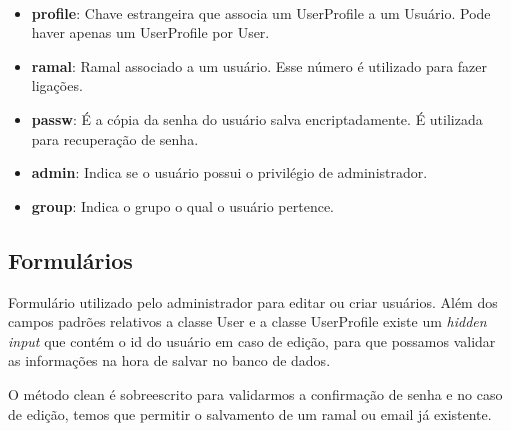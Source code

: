 \documentclass[letterpaper,10pt,brazil]{sphinxmanual}
\begin{document}
\begin{fulllineitems}
\label{apps/accounts:accounts.models.UserProfile}~\begin{itemize}
\item {} 
\textbf{profile}: Chave estrangeira que associa um UserProfile a um Usuário. Pode haver apenas um UserProfile por User.

\item {} 
\textbf{ramal}: Ramal associado a um usuário. Esse número é utilizado para fazer ligações.

\item {} 
\textbf{passw}: É a cópia da senha do usuário salva encriptadamente. É utilizada para recuperação de senha.

\item {} 
\textbf{admin}: Indica se o usuário possui o privilégio de administrador.

\item {} 
\textbf{group}: Indica o grupo o qual o usuário pertence.

\end{itemize}

\end{fulllineitems}



\subsection{Formulários}
\label{apps/accounts:module-accounts.forms}\label{apps/accounts:formularios}

\begin{fulllineitems}
\label{apps/accounts:accounts.forms.UserForm}
Formulário utilizado pelo administrador para editar ou criar usuários. Além dos campos padrões relativos a classe User e a classe UserProfile existe um \emph{hidden input} que contém o id do usuário em caso de edição, para que possamos validar as informações na hora de salvar no banco de dados.

O método clean é sobreescrito para validarmos a confirmação de senha e no caso de edição, temos que permitir o salvamento de um ramal ou email já existente.

\end{fulllineitems}

\end{document}
